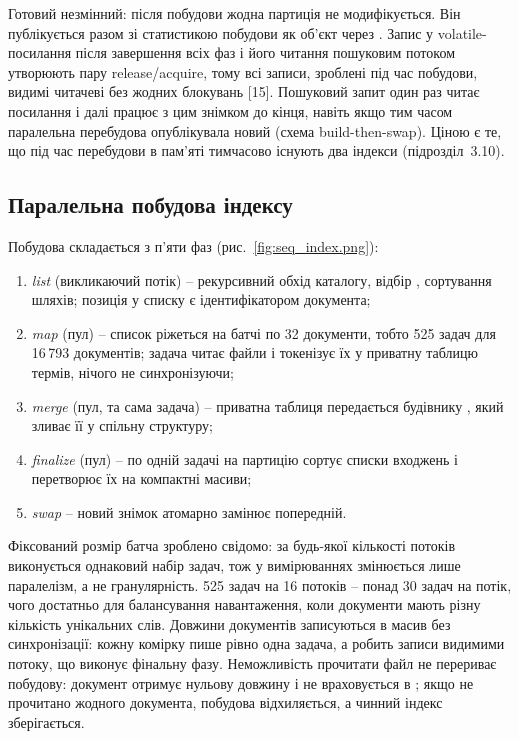 Готовий  незмінний: після побудови жодна партиція не модифікується. Він
публікується разом зі статистикою побудови як об'єкт  через
. Запис у volatile-посилання після завершення всіх фаз і його читання
пошуковим потоком утворюють пару release/acquire, тому всі записи, зроблені під час побудови,
видимі читачеві без жодних блокувань [15]. Пошуковий запит один раз читає посилання і далі
працює з цим знімком до кінця, навіть якщо тим часом паралельна перебудова опублікувала
новий (схема build-then-swap). Ціною є те, що під час перебудови в пам'яті тимчасово
існують два індекси (підрозділ~3.10).

\subsection{Паралельна побудова індексу}

Побудова складається з п'яти фаз (рис.~\ref{fig:seq_index.png}):
\begin{enumerate}[label=\arabic*)]
\item \textit{list} (викликаючий потік) -- рекурсивний обхід каталогу, відбір ,
сортування шляхів; позиція у списку є ідентифікатором документа;
\item \textit{map} (пул) -- список ріжеться на батчі по 32 документи, тобто 525 задач для
16\,793 документів; задача читає файли і токенізує їх у приватну таблицю термів, нічого не
синхронізуючи;
\item \textit{merge} (пул, та сама задача) -- приватна таблиця передається будівнику
, який зливає її у спільну структуру;
\item \textit{finalize} (пул) -- по одній задачі на партицію сортує списки входжень і
перетворює їх на компактні масиви;
\item \textit{swap} -- новий знімок атомарно замінює попередній.
\end{enumerate}

Фіксований розмір батча зроблено свідомо: за будь-якої кількості потоків виконується однаковий
набір задач, тож у вимірюваннях змінюється лише паралелізм, а не гранулярність. 525 задач на
16 потоків -- понад 30 задач на потік, чого достатньо для балансування навантаження, коли
документи мають різну кількість унікальних слів. Довжини документів записуються в масив
 без синхронізації: кожну комірку пише рівно одна задача, а
 робить записи видимими потоку, що виконує фінальну фазу. Неможливість
прочитати файл не перериває побудову: документ отримує нульову довжину і не враховується в
; якщо не прочитано жодного документа, побудова відхиляється, а
чинний індекс зберігається.

